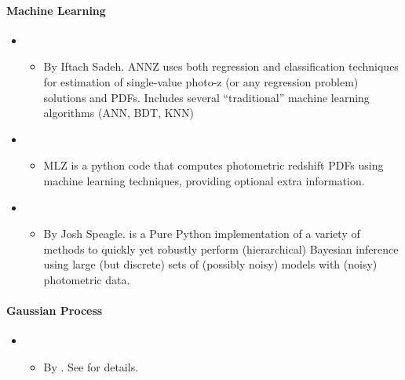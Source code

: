 \documentclass[letterpaper,10pt,english]{sphinxmanual}
\begin{document}
\paragraph{Machine Learning}
\label{\detokenize{resource/astro/topics/photoz:machine-learning}}\begin{itemize}
\item {} 
\begin{itemize}
\item {} 
By Iftach Sadeh. ANNZ uses both regression and classification
techniques for estimation of single-value photo-z (or any
regression problem) solutions and PDFs. Includes several
“traditional” machine learning algorithms (ANN, BDT, KNN)

\end{itemize}

\item {} 
\begin{itemize}
\item {} 
MLZ is a python code that computes photometric redshift PDFs using
machine learning techniques, providing optional extra information.

\end{itemize}

\item {} 
\begin{itemize}
\item {} 
By Josh Speagle.  is a Pure Python implementation of a
variety of methods to quickly yet robustly perform (hierarchical)
Bayesian inference using large (but discrete) sets of (possibly
noisy) models with (noisy) photometric data.

\end{itemize}

\end{itemize}


\paragraph{Gaussian Process}
\label{\detokenize{resource/astro/topics/photoz:gaussian-process}}\begin{itemize}
\item {} 
\begin{itemize}
\item {} 
By . See  for details.

\end{itemize}

\end{itemize}
\end{document}
